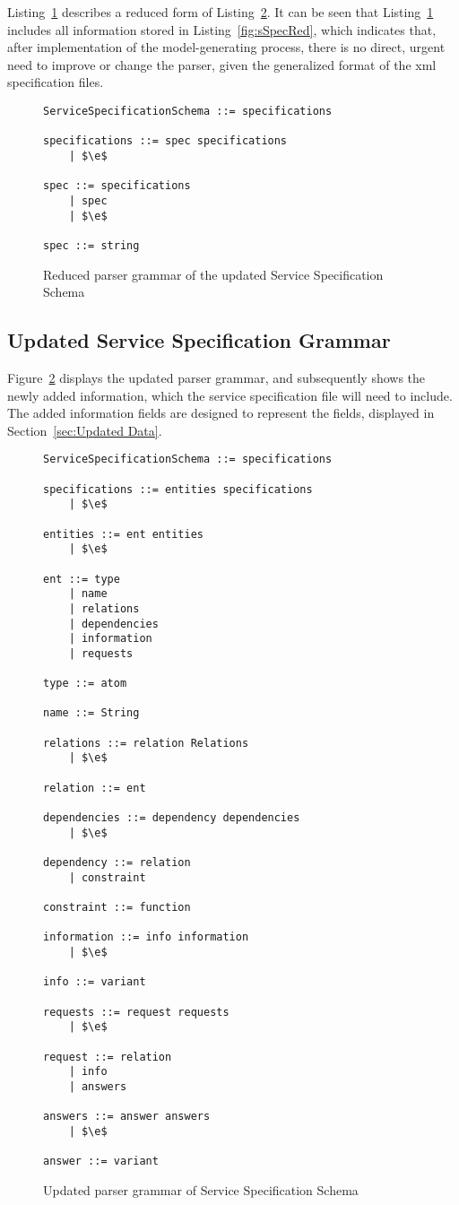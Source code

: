 Listing~\ref{fig:sSpecUpdRed} describes a reduced form of Listing~\ref{fig:sSpecUpd}. It can be seen that Listing~\ref{fig:sSpecUpdRed} includes all information stored in Listing~\ref{fig:sSpecRed}, which indicates that, after implementation of the model-generating process, there is no direct, urgent need to improve or change the parser, given the generalized format of the xml specification files.

\begin{figure}[h]
  \centering
  \begin{lstlisting}[keywordstyle={}]
ServiceSpecificationSchema ::= specifications

specifications ::= spec specifications
    | $\e$
     
spec ::= specifications
    | spec
    | $\e$

spec ::= string
  \end{lstlisting}
  \caption{Reduced parser grammar of the updated Service Specification Schema}
  \label{fig:sSpecUpdRed}
\end{figure}

\subsection{Updated Service Specification Grammar}

Figure~\ref{fig:sSpecUpd} displays the updated parser grammar, and subsequently shows the newly added information, which the service specification file will need to include. The added information fields are designed to represent the fields, displayed in Section~\ref{sec:Updated Data}.

\begin{figure}
  \centering
  \begin{lstlisting}[keywordstyle={}]
ServiceSpecificationSchema ::= specifications

specifications ::= entities specifications
    | $\e$
     
entities ::= ent entities
    | $\e$

ent ::= type
    | name
    | relations
    | dependencies
    | information
    | requests

type ::= atom

name ::= String

relations ::= relation Relations
    | $\e$

relation ::= ent

dependencies ::= dependency dependencies
    | $\e$

dependency ::= relation
    | constraint

constraint ::= function

information ::= info information
    | $\e$

info ::= variant

requests ::= request requests
    | $\e$

request ::= relation
    | info
    | answers

answers ::= answer answers
    | $\e$

answer ::= variant
  \end{lstlisting}
  \caption{Updated parser grammar of Service Specification Schema}
  \label{fig:sSpecUpd}
\end{figure}
\newpage
